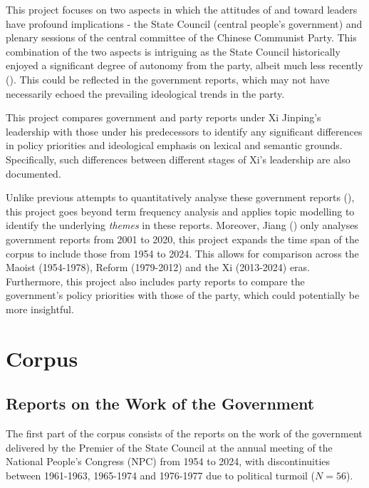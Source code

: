 \documentclass[
  letterpaper,
  abstract=true]{scrartcl}
\begin{document}
This project focuses on two aspects in which the attitudes of and toward
leaders have profound implications - the State Council (central people's
government) and plenary sessions of the central committee of the Chinese
Communist Party. This combination of the two aspects is intriguing as
the State Council historically enjoyed a significant degree of autonomy
from the party, albeit much less recently
(). This could be reflected in
the government reports, which may not have necessarily echoed the
prevailing ideological trends in the party.

This project compares government and party reports under Xi Jinping's
leadership with those under his predecessors to identify any significant
differences in policy priorities and ideological emphasis on lexical and
semantic grounds. Specifically, such differences between different
stages of Xi's leadership are also documented.

Unlike previous attempts to quantitatively analyse these government
reports (), this project goes beyond
term frequency analysis and applies topic modelling to identify the
underlying \emph{themes} in these reports. Moreover, Jiang
() only analyses government reports from
2001 to 2020, this project expands the time span of the corpus to
include those from 1954 to 2024. This allows for comparison across the
Maoist (1954-1978), Reform (1979-2012) and the Xi (2013-2024) eras.
Furthermore, this project also includes party reports to compare the
government's policy priorities with those of the party, which could
potentially be more insightful.

\section{Corpus}\label{corpus}

\subsection{Reports on the Work of the
Government}\label{reports-on-the-work-of-the-government}

The first part of the corpus consists of the reports on the work of the
government delivered by the Premier of the State Council at the annual
meeting of the National People's Congress (NPC) from 1954 to 2024, with
discontinuities between 1961-1963, 1965-1974 and 1976-1977 due to
political turmoil (\(N=56\)).
\end{document}
